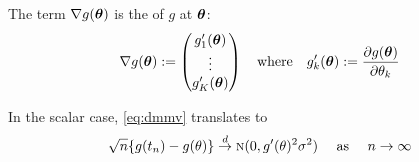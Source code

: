 \begin{frame}

    \vspace{2em}
    The term $\nabla g({\boldsymbol \theta})$ is the 
    of $g$ at ${\boldsymbol \theta}$:
    \begin{equation*}
        \nabla g({\boldsymbol \theta})
        := 
        \begin{pmatrix}
             g'_1({\boldsymbol \theta})
             \\
             \vdots
             \\
             g'_K({\boldsymbol \theta})
        \end{pmatrix}
        \quad \text{where} \quad
        g'_k ({\boldsymbol \theta}) := \frac{\partial g({\boldsymbol \theta})} {\partial \theta_k}
    \end{equation*}
    
    \vspace{1em}
    In the scalar case, \eqref{eq:dmmv} translates to     
    \begin{equation*}
        \label{eq:dm0}
        \sqrt{n} \{ g(t_n) - g(\theta) \}
        \stackrel { d } {\to} \textrm{\sc n}(0, g'(\theta)^2 \sigma^2)
         \quad \text{ as } \quad
         n \to \infty
    \end{equation*}
    
\end{frame}


